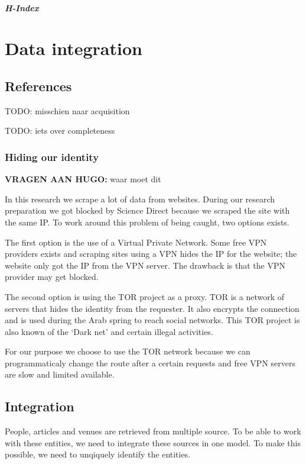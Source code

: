\documentclass{ou-report}
\newcommand{\todo}[1]{{\color{red} TODO: #1}}
\newcommand{\vraag}[1]{{\color{teal} {\textbf{VRAGEN AAN HUGO: }}#1}}
\begin{document}
\paragraph{H-Index}



\chapter{Data integration}

\section{References}
\todo{misschien naar acquisition}


\todo{iets over completeness}


\subsection{Hiding our identity}
\vraag{waar moet dit}

In this research we scrape a lot of data from websites.
During our research preparation we got blocked by Science Direct 
because we scraped the site with the same IP. To work around this problem of 
being caught, two options exists.

The first option is the use of a Virtual Private Network. Some free VPN 
providers exists and scraping sites using a VPN hides the IP for the website; 
the website only got the IP from the VPN server. The drawback is that the VPN
provider may get blocked.

The second option is using the TOR project as a proxy. TOR is a network of 
servers that hides the identity from the requester. It also encrypts the 
connection and is used during the Arab spring to reach social networks. This 
TOR project is also known of the `Dark net' and certain illegal activities.

For our purpose we choose to use the TOR network because we can programmaticaly
change the route after a certain requests and free VPN servers are slow and 
limited available.



\section{Integration}
People, articles and venues are retrieved
from multiple source. To be able to work with these entities, we need to 
integrate these sources in one model. To make this possible, we need to 
unqiquely identify the entities.
\end{document}

